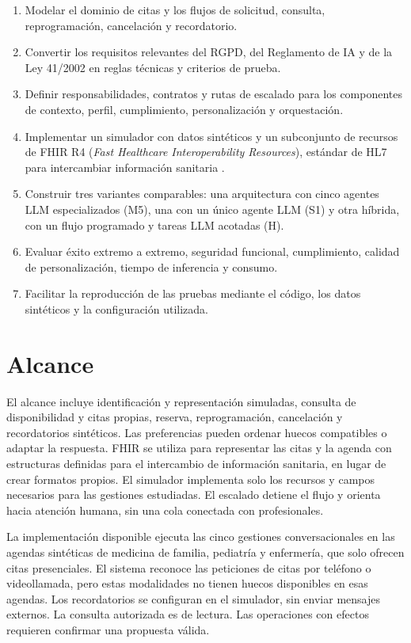 \begin{enumerate}
  \item Modelar el dominio de citas y los flujos de solicitud, consulta,
        reprogramación, cancelación y recordatorio.
  \item Convertir los requisitos relevantes del RGPD, del Reglamento de IA y de
        la Ley 41/2002 en reglas técnicas y criterios de prueba.
  \item Definir responsabilidades, contratos y rutas de escalado para los
        componentes de contexto, perfil, cumplimiento, personalización y
        orquestación.
  \item Implementar un simulador con datos sintéticos y un subconjunto de
        recursos de FHIR R4 (\textit{Fast Healthcare Interoperability
        Resources}), estándar de HL7 para intercambiar información sanitaria
        \citep{fhirR4}.
  \item Construir tres variantes comparables: una arquitectura con cinco
        agentes LLM especializados (M5), una con un único agente LLM (S1) y otra
        híbrida, con un flujo programado y tareas LLM acotadas (H).
  \item Evaluar éxito extremo a extremo, seguridad funcional, cumplimiento,
        calidad de personalización, tiempo de inferencia y consumo.
  \item Facilitar la reproducción de las pruebas mediante el código, los datos
        sintéticos y la configuración utilizada.
\end{enumerate}

\section{Alcance}

El alcance incluye identificación y representación simuladas, consulta de
disponibilidad y citas propias, reserva, reprogramación, cancelación y
recordatorios sintéticos. Las preferencias pueden ordenar huecos compatibles
o adaptar la respuesta. FHIR se utiliza para representar las citas y la agenda
con estructuras definidas para el intercambio de información sanitaria, en
lugar de crear formatos propios. El simulador implementa solo los recursos y
campos necesarios para las gestiones estudiadas. El escalado detiene el flujo
y orienta hacia atención humana, sin una cola conectada con profesionales.

La implementación disponible ejecuta las cinco gestiones conversacionales en
las agendas sintéticas de medicina de familia, pediatría y enfermería, que solo
ofrecen citas presenciales. El sistema reconoce las peticiones de citas por
teléfono o videollamada, pero estas modalidades no tienen huecos disponibles en
esas agendas. Los recordatorios se configuran en el simulador, sin enviar
mensajes externos. La consulta autorizada es de lectura. Las operaciones con
efectos requieren confirmar una propuesta válida.

